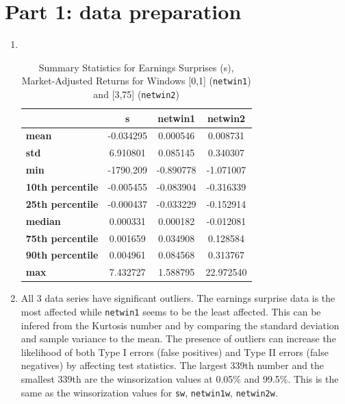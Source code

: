 \documentclass[11pt]{article}
\begin{document}

\section{Part 1: data preparation}

\begin{enumerate}
\renewcommand{\labelenumi}{(\theenumi)}
    \item \, \\
    \begin{table}[H]
        \centering
        \begin{tabular}{lccc}
        \hline
         & \textbf{s} & \textbf{netwin1} & \textbf{netwin2} \\
        \hline
        \textbf{mean} & -0.034295 & 0.000546 & 0.008731 \\
        \textbf{std} & 6.910801 & 0.085145 & 0.340307 \\
        \textbf{min} & -1790.209 & -0.890778 & -1.071007 \\
        \textbf{10th percentile} & -0.005455 & -0.083904 & -0.316339 \\
        \textbf{25th percentile} & -0.000437 & -0.033229 & -0.152914 \\
        \textbf{median} & 0.000331 & 0.000182 & -0.012081 \\
        \textbf{75th percentile} & 0.001659 & 0.034908 & 0.128584 \\
        \textbf{90th percentile} & 0.004961 & 0.084568 & 0.313767 \\
        \textbf{max} & 7.432727 & 1.588795 & 22.972540 \\
        \hline
        \end{tabular}
        \caption{Summary Statistics for Earnings Surprises (s), Market-Adjusted Returns for Windows [0,1] (\texttt{netwin1}) and [3,75] (\texttt{netwin2})}
    \end{table}

    \item All 3 data series have significant outliers. The earnings surprise data is the most affected while \texttt{netwin1} 
    seems to be the least affected. This can be infered from the Kurtosis number and by comparing the standard 
    deviation and sample variance to the mean.
    The presence of outliers can increase the likelihood of both Type I errors (false positives) 
    and Type II errors (false negatives) by affecting test statistics.
    The largest 339th number and the smallest 339th are the winsorization values at 0.05\% and 99.5\%. 
    This is the same as the winsorization values for \texttt{sw}, \texttt{netwin1w}, \texttt{netwin2w}.
    

\end{enumerate}
\end{document}
